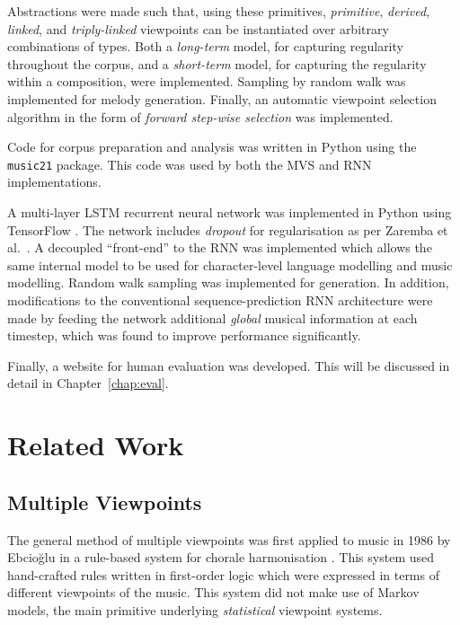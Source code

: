 \documentclass[12pt,a4paper,twoside,openright]{report}
\begin{document}
Abstractions were made such that, using these primitives, \emph{primitive},
\emph{derived}, \emph{linked}, and \emph{triply-linked} viewpoints can be
instantiated over arbitrary combinations of types. Both a \emph{long-term}
model, for capturing regularity throughout the corpus, and a \emph{short-term}
model, for capturing the regularity within a composition, were implemented.
Sampling by random walk was implemented for melody generation.  Finally, an
automatic viewpoint selection algorithm in the form of \emph{forward step-wise
selection} \cite{whorley2013phd} was implemented.

Code for corpus preparation and analysis was written in Python using the
\texttt{music21} package. This code was used by both the MVS and RNN
implementations.

A multi-layer LSTM recurrent neural network was implemented in Python using
TensorFlow \cite{abadi2016tensorflow}. The network includes \emph{dropout} for
regularisation as per Zaremba et al.\ \cite{zaremba2014recurrent}. A decoupled
``front-end'' to the RNN was implemented which allows the same internal model to
be used for character-level language modelling and music modelling. Random walk
sampling was implemented for generation. In addition, modifications to the
conventional sequence-prediction RNN architecture were made by feeding the
network additional \emph{global} musical information at each timestep, which was
found to improve performance significantly.

Finally, a website for human evaluation was developed. This will be discussed in
detail in Chapter~\ref{chap:eval}.

\section{Related Work}

\subsection{Multiple Viewpoints}

The general method of multiple viewpoints was first applied to music in 1986 by
Ebcioğlu in a rule-based system for chorale harmonisation
\cite{ebcioglu1986expert}.  This system used hand-crafted rules written in
first-order logic which were expressed in terms of different viewpoints of the
music. This system did not make use of Markov models, the main primitive
underlying \emph{statistical} viewpoint systems.
\end{document}
